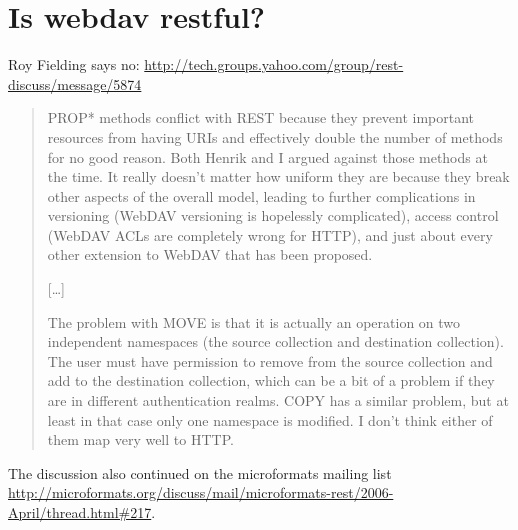 \documentclass[12pt,a4paper]{scrartcl}		%
\begin{document}
\title{}
\subtitle{}
\author{Thomas Koch\\\url{thomas@koch.ro}\\matriculation number 7250371}
\publishers{Fernuniversität Hagen\\Faculty of mathematics and computer science}
\date{\today}
\maketitle{}

\tableofcontents{}
\begin{abstract}

\end{abstract}
\newpage{}

\section{Is webdav restful?}

Roy Fielding says no: \url{http://tech.groups.yahoo.com/group/rest-discuss/message/5874}

\begin{quotation}
PROP* methods conflict with REST because they prevent
important resources from having URIs and effectively double the
number of methods for no good reason. Both Henrik and I argued
against those methods at the time. It really doesn't matter
how uniform they are because they break other aspects of the
overall model, leading to further complications in versioning
(WebDAV versioning is hopelessly complicated), access control
(WebDAV ACLs are completely wrong for HTTP), and just about every
other extension to WebDAV that has been proposed.

[\ldots]

The problem with MOVE is that it is actually an operation on two
independent namespaces (the source collection and destination
collection). The user must have permission to remove from the
source collection and add to the destination collection, which
can be a bit of a problem if they are in different authentication
realms. COPY has a similar problem, but at least in that case
only one namespace is modified. I don't think either of them map
very well to HTTP.
\end{quotation}

The discussion also continued on the microformats mailing list
\url{http://microformats.org/discuss/mail/microformats-rest/2006-April/thread.html#217}.
\end{document}
